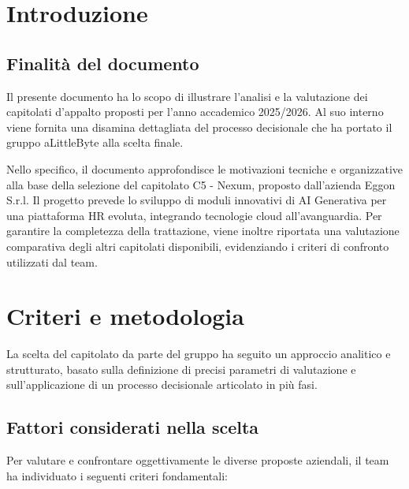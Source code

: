 \documentclass[a4paper,12pt]{article}
\begin{document}
\section{Introduzione}
\subsection{Finalità del documento}

Il presente documento ha lo scopo di illustrare l'analisi e la valutazione dei capitolati d'appalto proposti per l'anno accademico 2025/2026. Al suo interno viene fornita una disamina dettagliata del processo decisionale che ha portato il gruppo aLittleByte alla scelta finale.

Nello specifico, il documento approfondisce le motivazioni tecniche e organizzative alla base della selezione del capitolato C5 - Nexum, proposto dall'azienda Eggon S.r.l. Il progetto prevede lo sviluppo di moduli innovativi di AI Generativa per una piattaforma HR evoluta, integrando tecnologie cloud all'avanguardia. Per garantire la completezza della trattazione, viene inoltre riportata una valutazione comparativa degli altri capitolati disponibili, evidenziando i criteri di confronto utilizzati dal team.

\section{Criteri e metodologia}

La scelta del capitolato da parte del gruppo ha seguito un approccio analitico e strutturato, basato sulla definizione di precisi parametri di valutazione e sull'applicazione di un processo decisionale articolato in più fasi.

\subsection{Fattori considerati nella scelta}

Per valutare e confrontare oggettivamente le diverse proposte aziendali, il team ha individuato i seguenti criteri fondamentali:
\end{document}
